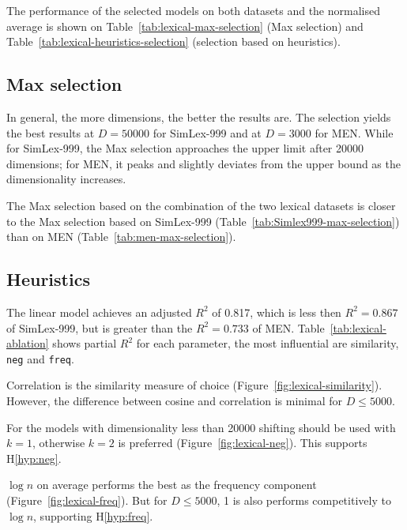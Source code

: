 The performance of the selected models on both datasets and the normalised average is shown on Table~\ref{tab:lexical-max-selection} (Max selection) and Table~\ref{tab:lexical-heuristics-selection} (selection based on heuristics).


\subsection{Max selection}
\label{sec:max-selection}

In general, the more dimensions, the better the results are. The selection yields the best results at $D = 50000$ for SimLex-999 and at $D = 3000$ for MEN. While for SimLex-999,  the Max selection approaches the upper limit after 20000 dimensions; for MEN, it peaks and slightly deviates from the upper bound as the dimensionality increases.

The Max selection based on the combination of the two lexical datasets is closer to the Max selection based on SimLex-999 (Table~\ref{tab:Simlex999-max-selection}) than on MEN (Table~\ref{tab:men-max-selection}).



\subsection{Heuristics}



The linear model achieves an adjusted $R^2$ of 0.817, which is less then $R^2 = 0.867$ of SimLex-999, but is greater than the $R^2 = 0.733$ of MEN. Table~\ref{tab:lexical-ablation} shows partial $R^2$ for each parameter, the most influential are similarity, \texttt{neg} and \texttt{freq}.


Correlation is the similarity measure of choice (Figure~\ref{fig:lexical-similarity}). However, the difference between cosine and correlation is minimal for $D \leq 5000$.

For the models with dimensionality less than 20000 shifting should be used with $k = 1$, otherwise $k = 2$ is preferred (Figure~\ref{fig:lexical-neg}). This supports H\ref{hyp:neg}.


$\log n$ on average performs the best as the frequency component (Figure~\ref{fig:lexical-freq}). But for $D \leq 5000$, 1 is also performs competitively to $\log n$, supporting H\ref{hyp:freq}.

